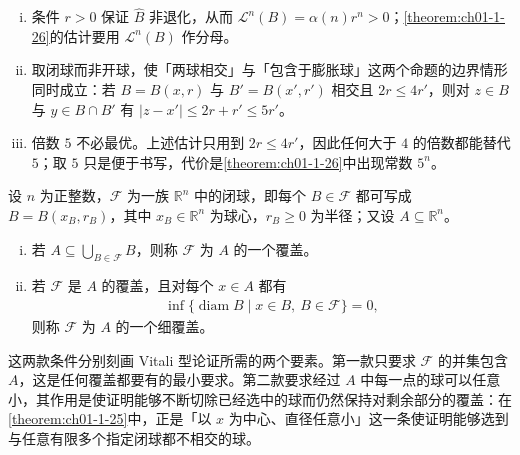 \documentclass[../../main.tex]{subfiles}%
\begin{document}
\begin{remark}\label{remark:ch01-05-bhat-条件}
\begin{enumerate}[(i)]
\item 条件 $r>0$ 保证 $\hat B$ 非退化，从而 $\mathcal{L}^n(B)=\alpha(n)r^n>0$；\cref{theorem:ch01-1-26}的估计要用 $\mathcal{L}^n(B)$ 作分母。%
\item 取闭球而非开球，使「两球相交」与「包含于膨胀球」这两个命题的边界情形同时成立：若 $B=B(x,r)$ 与 $B'=B(x',r')$ 相交且 $2r\leqslant4r'$，则对 $z\in B$ 与 $y\in B\cap B'$ 有 $\lvert z-x'\rvert\leqslant2r+r'\leqslant5r'$。
\item 倍数 $5$ 不必最优。上述估计只用到 $2r\leqslant4r'$，因此任何大于 $4$ 的倍数都能替代 $5$；取 $5$ 只是便于书写，代价是\cref{theorem:ch01-1-26}中出现常数 $5^n$。%
\end{enumerate}
\end{remark}

\begin{definition}[覆盖与细覆盖]\label{definition:ch01-1-19}
设 $n$ 为正整数，$\mathcal{F}$ 为一族 $\mathbb{R}^n$ 中的闭球，即每个 $B\in\mathcal{F}$ 都可写成 $B=B(x_B,r_B)$，其中 $x_B\in\mathbb{R}^n$ 为球心，$r_B\geqslant0$ 为半径；又设 $A\subseteq\mathbb{R}^n$。
\begin{enumerate}[(i)]
\item 若 $A\subseteq\bigcup_{B\in\mathcal{F}}B$，则称 $\mathcal{F}$ 为 $A$ 的一个覆盖。
\item 若 $\mathcal{F}$ 是 $A$ 的覆盖，且对每个 $x\in A$ 都有
\begin{align*}
\inf\{\operatorname{diam}B\mid x\in B,\ B\in\mathcal{F}\}=0,
\end{align*}
则称 $\mathcal{F}$ 为 $A$ 的一个细覆盖。
\end{enumerate}
\end{definition}

\begin{remark}\label{remark:ch01-def-1-19-动机}
这两款条件分别刻画 Vitali 型论证所需的两个要素。第一款只要求 $\mathcal{F}$ 的并集包含 $A$，这是任何覆盖都要有的最小要求。第二款要求经过 $A$ 中每一点的球可以任意小，其作用是使证明能够不断切除已经选中的球而仍然保持对剩余部分的覆盖：在\cref{theorem:ch01-1-25}中，正是「以 $x$ 为中心、直径任意小」这一条使证明能够选到与任意有限多个指定闭球都不相交的球。%
\end{remark}
\end{document}
